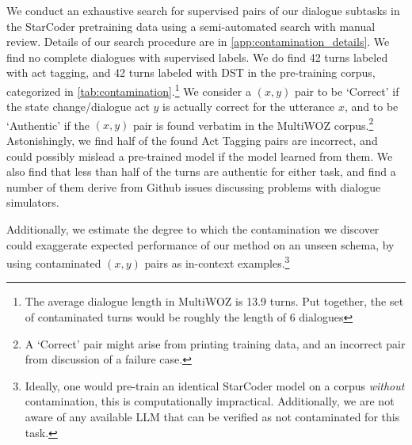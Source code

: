 \documentclass[11pt]{article}
\newcommand{\schema}[0]{\mathcal{S}}
\begin{document}
We conduct an exhaustive search for supervised pairs of our dialogue subtasks in the StarCoder pretraining data using a semi-automated search with manual review.  Details of our search procedure are in \autoref{app:contamination_details}.  We find no complete dialogues with supervised labels.  We do find 42 turns labeled with act tagging, and 42 turns labeled with DST in the pre-training corpus, categorized in \autoref{tab:contamination}.\footnote{The average dialogue length in MultiWOZ is 13.9 turns. Put together, the set of contaminated turns would be roughly the length of 6 dialogues}
We consider a $(x, y)$ pair to be `Correct' if the state change/dialogue act $y$ is actually correct for the utterance $x$, and to be `Authentic' if the $(x,y)$ pair is found verbatim in the MultiWOZ corpus.\footnote{A `Correct' pair might arise from printing training data, and an incorrect pair from discussion of a failure case.}
Astonishingly, we find half of the found Act Tagging pairs are incorrect, and could possibly mislead a pre-trained model if the model learned from them.
We also find that less than half of the turns are authentic for either task, and find a number of them derive from Github issues discussing problems with dialogue simulators.

Additionally, we estimate the degree to which the contamination we discover could exaggerate expected performance of our method on an unseen schema, by using contaminated $(x, y)$ pairs as in-context examples.\footnote{Ideally, one would pre-train an identical StarCoder model on a corpus \textit{without} contamination, this is computationally impractical. Additionally, we are not aware of any available LLM that can be verified as not contaminated for this task.}
\end{document}
